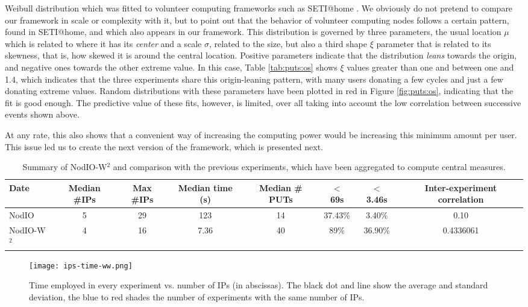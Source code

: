 \documentclass[journal,onecolumn]{IEEEtran}
\begin{document}
Weibull distribution which was fitted to volunteer computing
frameworks such as SETI@home \cite{javadi2009mining}. We obviously do
not pretend to compare our framework in scale or complexity with it, but
to point out that the behavior of volunteer computing nodes follows a
certain pattern, found in SETI@home, and which also appears in our framework. This
distribution is governed by three parameters, the usual location $\mu$
which is related to where it has its {\em center} and a scale $\sigma$,
related to the size, but also a third shape $\xi$ parameter that is
related to its skewness, that is, how skewed it is around the central
location. Positive parameters indicate that the distribution {\em
  leans} towards the origin, and negative ones towards the other extreme
value. In this case, Table \ref{tab:puts:os} shows $\xi$ values
greater than one and between one and 1.4, which indicates that the
three experiments share this origin-leaning pattern, with many users
donating a few cycles and just a few donating extreme values. Random
distributions with these parameters have been plotted in red in
Figure \ref{fig:puts:os}, indicating that the fit is good enough. The
predictive value of these fits, however, is limited, over all taking
into account the low correlation between successive events shown
above.

At any rate, this also shows that a convenient way of increasing the
computing power would be increasing this minimum amount per user. This
issue led us to create the next version of the framework, which is
presented next. %

\begin{table*}[!htb]
\caption{Summary of {\sf NodIO-W$^2$} and comparison with the previous
  experiments, which have been aggregated to compute central measures. \label{tab:summary:ww}}
\begin{center}
\begin{tabular}{l|ccccccc}
\hline
Date & Median \#IPs & Max \#IPs & Median time (s) & Median \# PUTs & $<$ 69s & $<$ 3.46s & Inter-experiment correlation\\
\hline
{\sf NodIO} & 5 & 29 & 123 & 14 & 37.43\% & 3.40\% & 0.10 \\
{\sf NodIO-W$^2$} & 4  & 16 & 7.36 & 40 & 89\% & 36.90\% & 0.4336061 \\
\hline
\end{tabular}
\end{center}
\end{table*}
%
\begin{figure}[!htb]
\centering
\texttt{[image: ips-time-ww.png]}
\caption{Time employed in every experiment vs. number of IPs (in
  abscissas). The black dot and line show the average and standard
  deviation, the blue to red shades the number of experiments with the same
  number of IPs. } 
\label{fig:ipstime:w2}
\end{figure}
\end{document}

